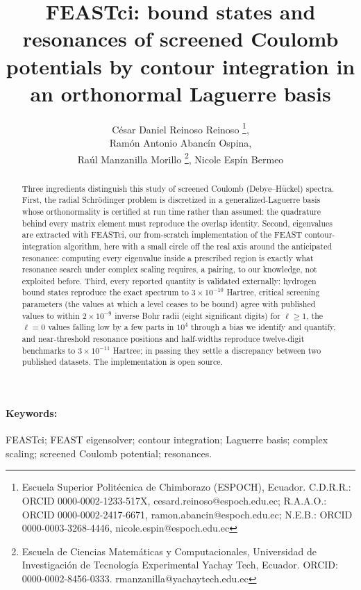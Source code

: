 \documentclass[12pt,twoside]{paper}
\author{C\'esar Daniel Reinoso Reinoso%
  \thanks{Escuela Superior Polit\'ecnica de Chimborazo (ESPOCH), Ecuador.
  C.D.R.R.: ORCID 0000-0002-1233-517X, cesard.reinoso@espoch.edu.ec;
  R.A.A.O.: ORCID 0000-0002-2417-6671, ramon.abancin@espoch.edu.ec;
  N.E.B.: ORCID 0000-0003-3268-4446, nicole.espin@espoch.edu.ec},\\
 Ram\'on Antonio Abanc\'in Ospina\footnotemark[1],\\
 Ra\'ul Manzanilla Morillo%
  \thanks{Escuela de Ciencias Matem\'aticas y Computacionales, Universidad
  de Investigaci\'on de Tecnolog\'ia Experimental Yachay Tech, Ecuador.
  ORCID: 0000-0002-8456-0333. rmanzanilla@yachaytech.edu.ec},
 Nicole Esp\'in Bermeo\footnotemark[1]}
\title{FEASTci: bound states and resonances of screened Coulomb
potentials by contour integration in an orthonormal Laguerre basis}
\newenvironment{keywords}{\paragraph{Keywords:}}{}}{}
\begin{document}
\sloppy

\maketitle

\begin{abstract}
Three ingredients distinguish this study of screened Coulomb
(Debye--H\"uckel) spectra. First, the radial Schr\"odinger problem is
discretized in a generalized-Laguerre basis whose orthonormality is
certified at run time rather than assumed: the quadrature behind every
matrix element must reproduce the overlap identity. Second, eigenvalues
are extracted with FEASTci, our from-scratch implementation of the FEAST
contour-integration algorithm, here with a small circle off the real axis
around the anticipated resonance: computing every eigenvalue inside a
prescribed region is exactly what resonance search under complex scaling
requires, a pairing, to our knowledge, not exploited before. Third,
every reported quantity is validated externally:
hydrogen bound states reproduce the exact spectrum to $3\times10^{-10}$
Hartree, critical screening parameters (the values at which a level ceases
to be bound) agree with published values to within $2\times10^{-9}$
inverse Bohr radii (eight significant digits) for $\ell \ge 1$, the
$\ell = 0$ values falling low by a few parts in $10^{4}$ through a bias we
identify and quantify, and near-threshold resonance positions and
half-widths reproduce twelve-digit benchmarks to $3\times10^{-11}$
Hartree; in passing they settle a discrepancy between two published
datasets. The implementation is open
source.
\end{abstract}

\begin{keywords}
FEASTci; FEAST eigensolver; contour integration; Laguerre basis;
complex scaling; screened Coulomb potential; resonances.
\end{keywords}
\end{document}
